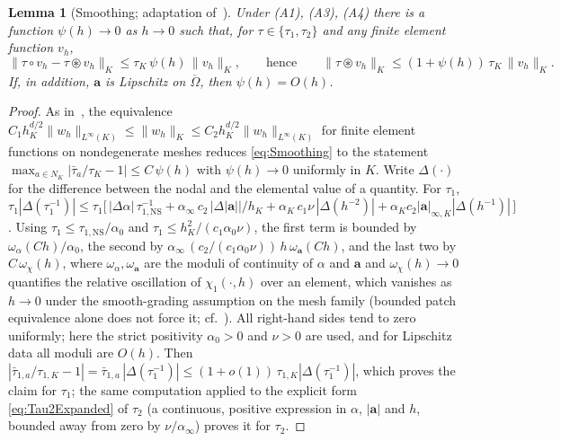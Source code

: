 \documentclass[11pt]{article}
\newtheorem{lemma}[theorem]{Lemma}
\theoremstyle{remark}
\newcommand{\ba}{\boldsymbol{a}}
\newcommand{\norm}[1]{\lVert #1 \rVert}
\newcommand{\normK}[1]{\lVert #1 \rVert_{K}}
\newcommand{\tns}{\tau_{1,\mathrm{NS}}}
\newcommand{\smul}{\circledast}
\newcommand{\pmul}{\circ}
\begin{document}
\begin{lemma}[Smoothing; adaptation of~{\cite[Lemma~2]{Codina2008}}]
\label{lem:smoothing}
Under \textup{(A1)}, \textup{(A3)}, \textup{(A4)} there is a function $\psi(h) \to 0$
as $h \to 0$ such that, for $\tau \in \{\tau_1, \tau_2\}$ and any finite element
function $v_h$,
\begin{equation}
  \label{eq:Smoothing}
  \norm{\tau\pmul v_h - \tau\smul v_h}_{K} \le \tau_K\,\psi(h)\,\normK{v_h},
  \qquad\text{hence}\qquad
  \norm{\tau\smul v_h}_{K} \le (1+\psi(h))\,\tau_K\,\normK{v_h}.
\end{equation}
If, in addition, $\ba$ is Lipschitz on $\overline\Omega$, then $\psi(h) = O(h)$.
\end{lemma}

\begin{proof}
As in~\cite[Lemma~2]{Codina2008}, the equivalence
$C_1 h_K^{d/2}\norm{w_h}_{L^\infty(K)} \le \normK{w_h} \le
C_2 h_K^{d/2}\norm{w_h}_{L^\infty(K)}$ for finite element functions on nondegenerate
meshes reduces \cref{eq:Smoothing} to the statement
$\max_{a\in N_K} |\bar\tau_a/\tau_K - 1| \le C\,\psi(h)$ with $\psi(h)\to 0$
uniformly in $K$. Write $\Delta(\cdot)$ for the difference between the nodal and the
elemental value of a quantity. For $\tau_1$,
$\tau_{1}|\Delta(\tau_1^{-1})| \le
\tau_1\bigl[\,|\Delta\alpha|\,\tns^{-1}
+ \alpha_\infty\, c_2\,|\Delta|\ba||/h_K
+ \alpha_K\, c_1\nu\,|\Delta(h^{-2})| + \alpha_K c_2 |\ba|_{\infty,K}|\Delta(h^{-1})|\,\bigr]$.
Using $\tau_1 \le \tns/\alpha_0$ and $\tau_1 \le h_K^2/(c_1\alpha_0\nu)$,
the first term is bounded by $\omega_\alpha(Ch)/\alpha_0$, the second by
$\alpha_\infty\,(c_2/(c_1\alpha_0\nu))\,h\,\omega_{\ba}(Ch)$, and the last two by
$C\,\omega_{\chi}(h)$, where $\omega_\alpha, \omega_{\ba}$ are the moduli of
continuity of $\alpha$ and $\ba$ and $\omega_\chi(h)\to 0$ quantifies the relative
oscillation of $\chi_1(\cdot,h)$ over an element, which vanishes as $h \to 0$ under the
smooth-grading assumption on the mesh family (bounded patch equivalence alone does not
force it; cf.~\cite[Lemma~1]{Codina2008}). All right-hand sides tend to zero
uniformly; here the strict positivity $\alpha_0 > 0$ and $\nu > 0$ are used, and for
Lipschitz data all moduli are $O(h)$. Then
$|\bar\tau_{1,a}/\tau_{1,K} - 1| = \bar\tau_{1,a}\,|\Delta(\tau_1^{-1})|
\le (1+o(1))\,\tau_{1,K}|\Delta(\tau_1^{-1})|$, which proves the claim for $\tau_1$;
the same computation applied to the explicit form \cref{eq:Tau2Expanded} of $\tau_2$
(a continuous, positive expression in $\alpha$, $|\ba|$ and $h$, bounded away from
zero by $\nu/\alpha_\infty$) proves it for $\tau_2$.
\end{proof}
\end{document}
